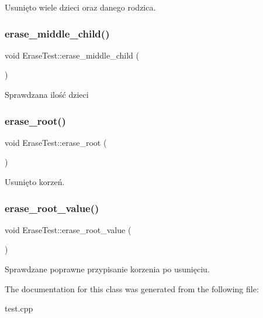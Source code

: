 Usunięto wiele dzieci oraz danego rodzica. \mbox{\label{class_erase_test_ae6bc0aa4ecaa1f2966a0e4f971d229d1}} 
\subsubsection{\texorpdfstring{erase\+\_\+middle\+\_\+child()}{erase\_middle\_child()}}
{\footnotesize\ttfamily void Erase\+Test\+::erase\+\_\+middle\+\_\+child (\begin{DoxyParamCaption}{ }\end{DoxyParamCaption})\hspace{0.3cm}{\ttfamily [inline]}}

Sprawdzana ilość dzieci \mbox{\label{class_erase_test_aa245715a2bbbcf0bd6abcca1a0992055}} 
\subsubsection{\texorpdfstring{erase\+\_\+root()}{erase\_root()}}
{\footnotesize\ttfamily void Erase\+Test\+::erase\+\_\+root (\begin{DoxyParamCaption}{ }\end{DoxyParamCaption})\hspace{0.3cm}{\ttfamily [inline]}}

Usunięto korzeń. \mbox{\label{class_erase_test_a3b1971101ff3dc813242f02a0cff68bf}} 
\subsubsection{\texorpdfstring{erase\+\_\+root\+\_\+value()}{erase\_root\_value()}}
{\footnotesize\ttfamily void Erase\+Test\+::erase\+\_\+root\+\_\+value (\begin{DoxyParamCaption}{ }\end{DoxyParamCaption})\hspace{0.3cm}{\ttfamily [inline]}}

Sprawdzane poprawne przypisanie korzenia po usunięciu. 

The documentation for this class was generated from the following file\+:\begin{DoxyCompactItemize}
\item 
test.\+cpp\end{DoxyCompactItemize}
